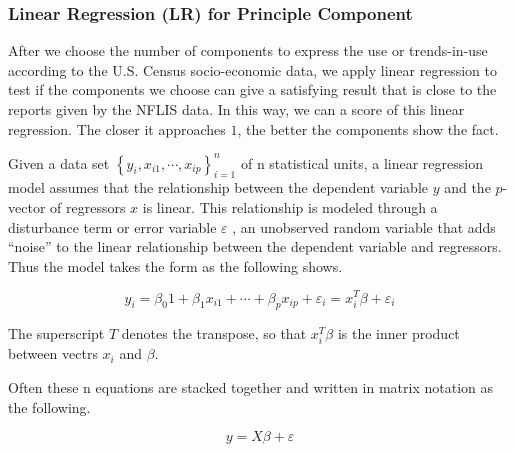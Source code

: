\documentclass{mcmthesis}
\begin{document}
\subsubsection{Linear Regression (LR) for Principle Component}
After we choose the number of components to express the use or trends-in-use according to the U.S. Census socio-economic data, we apply linear regression to test if the components we choose can give a satisfying result that is close to the reports given by the NFLIS data. In this way, we can a score of this linear regression. The closer it approaches $1$, the better the components show the fact.

Given a data set $\left \{ y_{i}, x_{i1}, \cdots , x_{ip} \right \}_{i = 1}^{n}$ of n statistical units, a linear regression model assumes that the relationship between the dependent variable $y$ and the $p$-vector of regressors $x$ is linear. This relationship is modeled through a disturbance term or error variable $ε$ , an unobserved random variable that adds ``noise'' to the linear relationship between the dependent variable and regressors. Thus the model takes the form  as the following shows.

\begin{equation}
    y_i = \beta_{0}1+ \beta_{1}x_{i1}+\cdots +\beta_{p}x_{ip} + \varepsilon _{i} = x_{i}^{T}\beta + \varepsilon_{i}
\end{equation}

The superscript $T$ denotes the transpose, so that $x_{i}^{T}\beta$ is the inner product between vectrs $x_{i}$ and $\beta$. 

Often these n equations are stacked together and written in matrix notation as the following.

\begin{equation}
    y = X\beta + \varepsilon
\end{equation}
\end{document}
